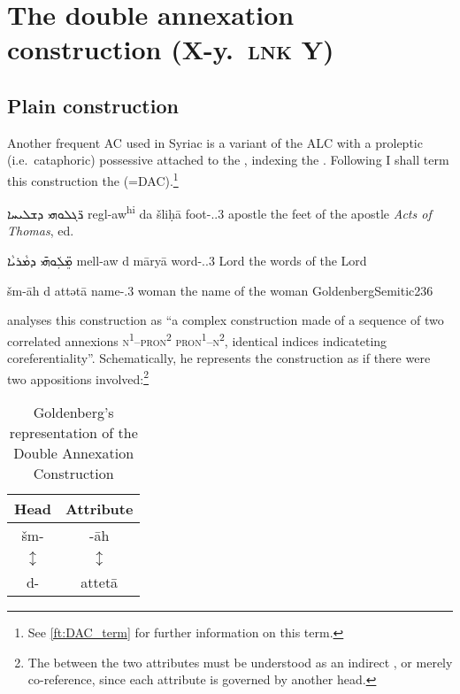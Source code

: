 {{{{\section{The double annexation construction (X-y.\poss\ \textsc{lnk} Y)} \label{ss:syr_DAC}

\subsection{Plain construction}

Another frequent AC used in Syriac is a variant of the ALC with a proleptic (i.e.\ cataphoric) possessive  attached to the \prim, indexing the \secn. 
Following \citet[234, fn. 15]{GoldenbergSemitic} I shall term this construction the  (=DAC).\footnote{See \vref{ft:DAC_term} for further information on this term.}


{ܪ̈\hspace{-0.8ex}ܓܠܘܗܝ ܕܫܠܝܚܐ}
{regl-aw\textsuperscript{hi} da\cb{} šliḥā}
{foot-\pl.\poss.3\masc{} \lnk\cb{} apostle}
{the feet of the apostle}
{\textit{Acts of Thomas}, ed.\ \cite[]{WrightActs}}

{ܡܸ̈ܠܲܘܗ̄ܝ ܕܡܵܪܝܵܐ}
{mell-aw d\cb{} māryā}
{word-\pl.\poss.3\masc{} \lnk\cb{} Lord}
{the words of the Lord}
{\cite[88, \S 112d]{MuraokaSyriac}}

{šm-āh d\cb{} attətā}
{name-\poss.3\fem{} \lnk\cb{} woman}
{the name of the woman}
{GoldenbergSemitic}{236}

\citet[234]{GoldenbergSemitic} analyses this construction as \enquote{a complex construction made of a sequence of two correlated annexions \textsc{n}\textsuperscript{1}--\textsc{pron}\textsuperscript{2} \~ \textsc{pron}\textsuperscript{1}--\textsc{n}\textsuperscript{2}, identical indices indicateting coreferentiality}. Schematically, he represents the construction as if there were two appositions involved:\footnote{The  between the two attributes must be understood as an indirect , or merely co-reference, since each attribute is governed by another head.}

\begin{table}[h]
\centering
\begin{tabular}{c c}
\toprule
Head & Attribute \\
\midrule 
šm-	& -āh \\
$\updownarrow$	& $\updownarrow$	 \\
d-	& attetā \\
\bottomrule
\end{tabular}
\caption[Goldenberg's representation of the Double Annexation Construction]{Goldenberg's representation of the Double Annexation Construction} \label{tb:DAC}
\end{table}

}}}}
